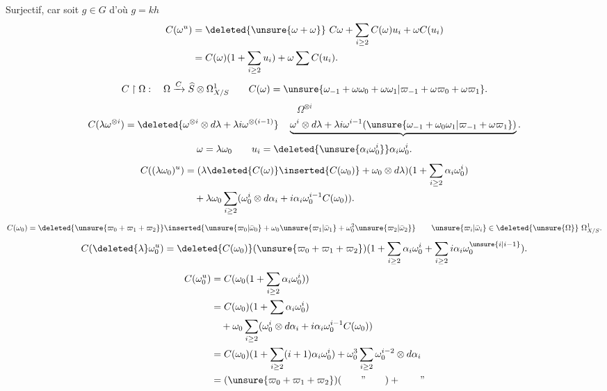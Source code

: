  Surjectif, car soit $g\in G$
d'où $g=kh$
\[
\begin{aligned}
C(\omega^u)&=\deleted{\unsure{\omega+\omega}}\ C\omega+\sum_{i\geq2}C(\omega)u_i+\omega C(u_i)\\
&=C(\omega)(1+\sum_{i\geq2}u_i)+\omega\sum C(u_i).
\end{aligned}
\]
\[
C\upharpoonright\Omega:\quad\Omega\xrightarrow{C}\widehat S\otimes\Omega^1_{X/S}
\qquad C(\omega)=\unsure{\omega_{-1}+\omega\omega_0+\omega\omega_1|\varpi_{-1}+\omega\varpi_0+\omega\varpi_1}.
\]
\[\Omega^{\otimes i}\]
\[
C(\lambda\omega^{\otimes i})=
\deleted{\omega^{\otimes i}\otimes d\lambda+\lambda i\omega^{\otimes(i-1)}}
\quad\underbrace{\omega^i\otimes d\lambda+\lambda i\omega^{i-1}(\unsure{\omega_{-1}+\omega_0\omega_1|\varpi_{-1}+\omega\varpi_1})}.
\]
\[\omega=\lambda\omega_0\qquad u_i=\deleted{\unsure{\alpha_i\omega_0^i}}\alpha_i\omega_0^i.\]
\[
\begin{aligned}
C((\lambda\omega_0)^u)&=(\lambda\deleted{C(\omega)}\inserted{C(\omega_0)}+\omega_0\otimes d\lambda)(1+\sum_{i\geq2}\alpha_i\omega_0^i)\\
&\quad+\lambda\omega_0\sum_{i\geq2}(\omega_0^i\otimes d\alpha_i+i\alpha_i\omega_0^{i-1}C(\omega_0)).
\end{aligned}
\]
\[
C(\omega_0)=\deleted{\unsure{\varpi_0+\varpi_1+\varpi_2}}
\inserted{\unsure{\varpi_0|\bar\omega_0}+\omega_0\unsure{\varpi_1|\bar\omega_1}+\omega_0^2\unsure{\varpi_2|\bar\omega_2}}
\qquad\unsure{\varpi_i|\bar\omega_i}\in\deleted{\unsure{\Omega}}\ \Omega^1_{X/S}.
\]
\[
C(\deleted{\lambda}\omega_0^u)=\deleted{C(\omega_0)}(\unsure{\varpi_0+\varpi_1+\varpi_2})(1+\sum_{i\geq2}\alpha_i\omega_0^i+\sum_{i\geq2}i\alpha_i\omega_0^{\unsure{i|i-1}}).
\]
\[
\begin{aligned}
C(\omega_0^u)&=C(\omega_0(1+\sum_{i\geq2}\alpha_i\omega_0^i))\\
&=C(\omega_0)(1+\sum\alpha_i\omega_0^i)\\
&\quad+\omega_0\sum_{i\geq2}(\omega_0^i\otimes d\alpha_i+i\alpha_i\omega_0^{i-1}C(\omega_0))\\
&=C(\omega_0)(1+\sum_{i\geq2}(i+1)\alpha_i\omega_0^i)+\omega_0^3\sum_{i\geq2}\omega_0^{i-2}\otimes d\alpha_i\\
&=(\unsure{\varpi_0+\varpi_1+\varpi_2})(\qquad\text{''}\qquad)+\qquad\text{''}
\end{aligned}
\]
